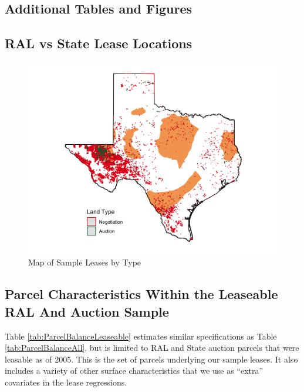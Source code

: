 \documentclass[12pt]{article}
\begin{document}
\begin{appendices}

\section{Additional Tables and Figures}

\setcounter{figure}{0}  \renewcommand{\thefigure}{A.\arabic{figure}} 
\setcounter{table}{0}  \renewcommand{\thetable}{A.\arabic{table}} 

\subsection{RAL vs State Lease Locations}
\begin{figure}[H]
\begin{centering}
\caption{Map of Sample Leases by Type \label{fig:RAL_map}}
\vspace{-10pt}
\includegraphics[width=1\textwidth]{../output/figures/glo_leases_in_texas.png}
\par\end{centering}
\end{figure}

\subsection{Parcel Characteristics Within the Leaseable RAL And Auction Sample}
Table \ref{tab:ParcelBalanceLeaseable} estimates similar specifications as Table \ref{tab:ParcelBalanceAll}, but is limited to RAL and State auction parcels that were leasable as of 2005.  This is the set of parcels underlying our sample leases.  It also includes a variety of other surface characteristics that we use as ``extra'' covariates in the lease regressions.  


\end{appendices}
\end{document}
